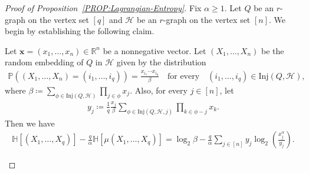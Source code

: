 \documentclass[10pt,a4paper]{amsart}
\begin{document}
\begin{proof}[Proof of Proposition~\ref{PROP:Lagrangian-Entropy}]
    Fix $\alpha \ge 1$. 
    Let $Q$ be an $r$-graph on the vertex set $[q]$ and $\mathcal{H}$ be an $r$-graph on the vertex set $[n]$. 
    We begin by establishing the following claim.

    \begin{claim}\label{CLAIM:entropy-difference-simplify}
        Let $\mathbf{x} = (x_1, \ldots, x_n) \in \mathbb{R}^{n}$ be a nonnegative vector. 
        Let $(X_1, \ldots, X_n)$ be the random embedding of $Q$ in $\mathcal{H}$ given by the distribution
        \begin{align}\label{equ:random-Q-prob-def}
            \mathbb{P}\left((X_1, \ldots, X_n) = (i_1, \ldots, i_q)\right)
            = \frac{x_{i_1} \cdots x_{i_q}}{\beta}
            \quad\text{for every}\quad (i_1, \ldots, i_q) \in \mathrm{Inj}(Q,\mathcal{H}), 
        \end{align}
        where $\beta \coloneqq \sum_{\phi \in \mathrm{Inj}(Q,\mathcal{H})} \prod_{j \in \phi} x_j$. 
        Also, for every $j \in [n]$, let 
        \begin{align}
            y_j 
            \coloneqq \frac{1}{q} \frac{x_j}{\beta} \sum_{\phi \in \mathrm{Inj}(Q,\mathcal{H}, j)} \prod_{k\in \phi - j} x_k. \label{equ:random-yj-prob-def}
        \end{align}
        Then we have 
        \begin{align*}
            \mathbb{H}[(X_1, \ldots, X_{q})] - \frac{q}{\alpha} \mathbb{H}[\mu(X_1, \ldots, X_q)] 
            = \log_{2} \beta - \frac{q}{\alpha} \sum_{j \in [n]} y_j \log_{2}\left(\frac{x_j^{\alpha}}{y_j}\right). 

\end{align*}
\end{claim}
\end{proof}
\end{document}
